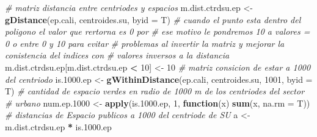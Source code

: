 \documentclass[12pt,]{book}
\newenvironment{Shaded}{\begin{snugshade}}{\end{snugshade}}
\newcommand{\KeywordTok}[1]{\textcolor[rgb]{0.13,0.29,0.53}{\textbf{#1}}}
\newcommand{\DataTypeTok}[1]{\textcolor[rgb]{0.13,0.29,0.53}{#1}}
\newcommand{\DecValTok}[1]{\textcolor[rgb]{0.00,0.00,0.81}{#1}}
\newcommand{\FloatTok}[1]{\textcolor[rgb]{0.00,0.00,0.81}{#1}}
\newcommand{\StringTok}[1]{\textcolor[rgb]{0.31,0.60,0.02}{#1}}
\newcommand{\CommentTok}[1]{\textcolor[rgb]{0.56,0.35,0.01}{\textit{#1}}}
\newcommand{\ControlFlowTok}[1]{\textcolor[rgb]{0.13,0.29,0.53}{\textbf{#1}}}
\newcommand{\OperatorTok}[1]{\textcolor[rgb]{0.81,0.36,0.00}{\textbf{#1}}}
\newcommand{\NormalTok}[1]{#1}
\begin{document}
\begin{Shaded}
\begin{Highlighting}[]
\CommentTok{# matriz distancia entre centriodes y espacios}
\NormalTok{m.dist.ctrdsu.ep <-}\StringTok{ }\KeywordTok{gDistance}\NormalTok{(ep.cali, centroides.su, }\DataTypeTok{byid =}\NormalTok{ T)}
\CommentTok{# cuando el punto esta dentro del poligono el valor que rertorna es 0 por}
\CommentTok{# ese motivo le pondremos 10 a valores = 0 o entre 0 y 10 para evitar}
\CommentTok{# problemas al invertir la matriz y mejorar la conistencia del indices con}
\CommentTok{# valores inversos a la distancia}
\NormalTok{m.dist.ctrdsu.ep[m.dist.ctrdsu.ep }\OperatorTok{<}\StringTok{ }\DecValTok{10}\NormalTok{] <-}\StringTok{ }\DecValTok{10}
\CommentTok{# matriz consicion de estar a 1000 del centriodo}
\NormalTok{is.}\FloatTok{1000.}\NormalTok{ep <-}\StringTok{ }\KeywordTok{gWithinDistance}\NormalTok{(ep.cali, centroides.su, }\DecValTok{1001}\NormalTok{, }\DataTypeTok{byid =}\NormalTok{ T)}
\CommentTok{# cantidad de espacio verdes en radio de 1000 m de los centriodes del sector}
\CommentTok{# urbano}
\NormalTok{num.ep.}\DecValTok{1000}\NormalTok{ <-}\StringTok{ }\KeywordTok{apply}\NormalTok{(is.}\FloatTok{1000.}\NormalTok{ep, }\DecValTok{1}\NormalTok{, }\ControlFlowTok{function}\NormalTok{(x) }\KeywordTok{sum}\NormalTok{(x, }\DataTypeTok{na.rm =}\NormalTok{ T))}
\CommentTok{# distancias de Espacio publicos a 1000 del centriode de SU}
\NormalTok{a <-}\StringTok{ }\NormalTok{m.dist.ctrdsu.ep }\OperatorTok{*}\StringTok{ }\NormalTok{is.}\FloatTok{1000.}\NormalTok{ep}


\end{Highlighting}
\end{Shaded}
\end{document}

